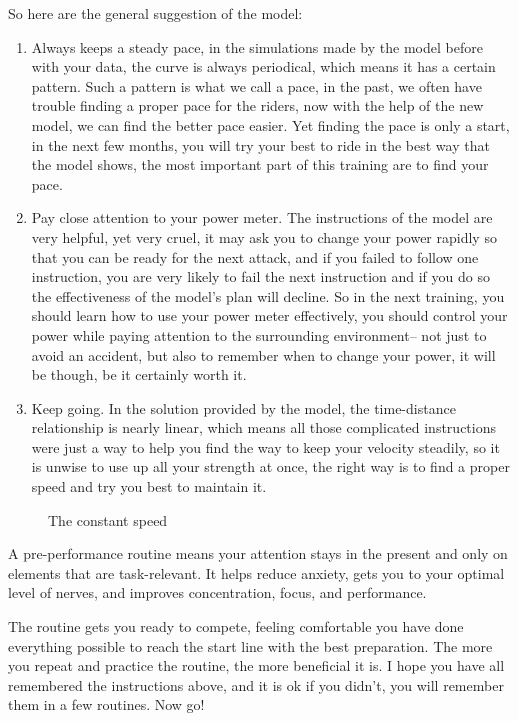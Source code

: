 \documentclass[12pt]{article}
\begin{document}
So here are the general suggestion of the model:
\begin{enumerate}
    \item Always keeps a steady pace, in the simulations made by the model before with your data, the curve is always periodical, which means it has a certain pattern. Such a
    pattern is what we call a pace, in the past, we often have trouble finding a proper pace for the riders, now with the help of the new model, we can find the
    better pace easier. Yet finding the pace is only a start, in the next few months, you will try your best to ride in the best way that the model shows, the most important part of this training are to find your pace.
    \item  Pay close attention to your power meter. The instructions of the model are very helpful, yet very cruel, it may ask you to change your 
    power rapidly so that you can be ready for the next attack, and if you failed to follow one instruction, you are very likely to fail the next instruction and if you do so
    the effectiveness of the model's plan will decline.  So in the next training, you should learn how to use your power meter effectively, you should control your power while
    paying attention to the surrounding environment-- not just to avoid an accident, but also to remember when to change your power, it will be though, be it certainly worth it.
    \item Keep going. In the solution provided by the model, the time-distance relationship is nearly linear, which means all those complicated instructions were just a way to help
    you find the way to keep your velocity steadily, so it is unwise to use up all your strength at once, the right way is to find a proper speed and try you best to maintain 
    it.
\end{enumerate}

\begin{figure}[H]
    \centering
    
    \caption{The constant speed}
\end{figure}
A pre-performance routine means your attention stays in the present and only on elements that are task-relevant. It helps reduce anxiety, gets you to your optimal level
of nerves, and improves concentration, focus, and performance.

The routine gets you ready to compete, feeling comfortable you have done everything possible to reach the start line with the best preparation. The more you repeat and
practice the routine, the more beneficial it is. I hope you have all remembered the instructions above, and it is ok if you didn't, you will remember them in a few routines.
Now go!





\end{document}
